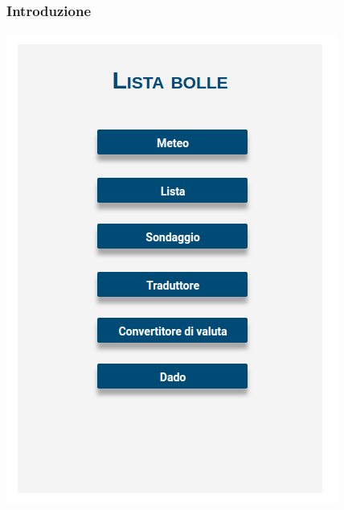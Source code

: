 \begin{frame}
   \frametitle{Introduzione}
  \begin{center}
  	\includegraphics[scale=0.35]{img/mockup_2.png}
  \end{center}
   
  
\end{frame}

